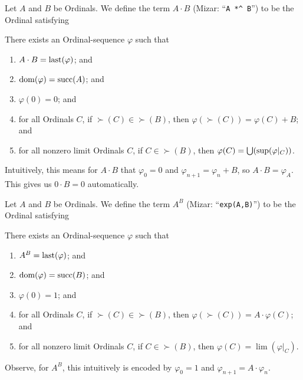 \documentclass{article}
\begin{document}
\begin{definition}
Let $A$ and $B$ be Ordinals.
We define the term $A\cdot B$ (Mizar: ``\verb#A *^ B#'')
to be the Ordinal satisfying
\begin{defn}
\item There exists an Ordinal-sequence $\varphi$ such that
  \begin{enumerate}[label=(\roman*)]
  \item $A\cdot B=\operatorname{last}(\varphi)$; and
  \item $\operatorname{dom}(\varphi)=\operatorname{succ}(A)$; and
  \item $\varphi(0)=0$; and
  \item for all Ordinals $C$, if $\succ(C)\in\succ(B)$,
    then $\varphi(\succ(C))=\varphi(C)+B$;
    and
  \item for all nonzero limit Ordinals $C$, if $C\in\succ(B)$, then $\varphi(C)=\bigcup(\sup(\varphi|_{C}))$.
  \end{enumerate}
\end{defn}
\end{definition}

\begin{remark}
Intuitively, this means for $A\cdot B$ that $\varphi_{0}=0$ and
$\varphi_{n+1}=\varphi_{n}+B$, so $A\cdot B=\varphi_{A}$. This gives us
$0\cdot B=0$ automatically.
\end{remark}

\begin{definition}
Let $A$ and $B$ be Ordinals.
We define the term $A^{B}$ (Mizar: ``\verb#exp(A,B)#'') to be the
Ordinal satisfying
\begin{defn}
\item There exists an Ordinal-sequence $\varphi$ such that
  \begin{enumerate}[label=(\roman*)]
  \item $A^{B}=\operatorname{last}(\varphi)$; and
  \item $\operatorname{dom}(\varphi)=\operatorname{succ}(B)$; and
  \item $\varphi(0)=1$; and
  \item for all Ordinals $C$, if $\succ(C)\in\succ(B)$,
    then $\varphi(\succ(C))=A\cdot\varphi(C)$;
    and
  \item for all nonzero limit Ordinals $C$, if $C\in\succ(B)$, then $\varphi(C)=\lim(\varphi|_{C})$.
  \end{enumerate}
\end{defn}
\end{definition}

\begin{remark}
Observe, for $A^{B}$, this intuitively is encoded by $\varphi_{0}=1$ and
$\varphi_{n+1}=A\cdot\varphi_{n}$. 
\end{remark}
\end{document}

